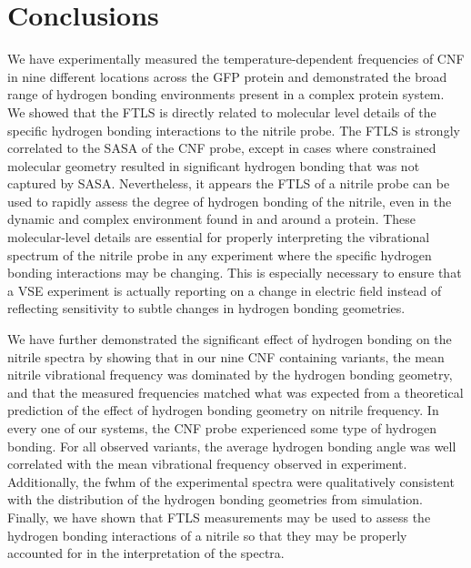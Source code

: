 \section{Conclusions}

We have experimentally measured the temperature-dependent frequencies of CNF in nine different locations across the GFP protein and demonstrated the broad range of hydrogen bonding environments present in a complex protein system.
We showed that the FTLS is directly related to molecular level details of the specific hydrogen bonding interactions to the nitrile probe.
The FTLS is strongly correlated to the SASA of the CNF probe, except in cases where constrained molecular geometry resulted in significant hydrogen bonding that was not captured by SASA.
Nevertheless, it appears the FTLS of a nitrile probe can be used to rapidly assess the degree of hydrogen bonding of the nitrile, even in the dynamic and complex environment found in and around a protein.
These molecular-level details are essential for properly interpreting the vibrational spectrum of the nitrile probe in any experiment where the specific hydrogen bonding interactions may be changing.
This is especially necessary to ensure that a VSE experiment is actually reporting on a change in electric field instead of reflecting sensitivity to subtle changes in hydrogen bonding geometries. 

We have further demonstrated the significant effect of hydrogen bonding on the nitrile spectra by showing that in our nine CNF containing variants, the mean nitrile vibrational frequency was dominated by the hydrogen bonding geometry, and that the measured frequencies matched what was expected from a theoretical prediction of the effect of hydrogen bonding geometry on nitrile frequency.
In every one of our systems, the CNF probe experienced some type of hydrogen bonding.
For all observed variants, the average hydrogen bonding angle was well correlated with the mean vibrational frequency observed in experiment.
Additionally, the fwhm of the experimental spectra were qualitatively consistent with the distribution of the hydrogen bonding geometries from simulation.
Finally, we have shown that FTLS measurements may be used to assess the hydrogen bonding interactions of a nitrile so that they may be properly accounted for in the interpretation of the spectra.





